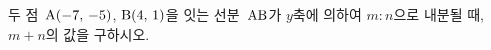 두 점~$\mathrm{A}(-7,\mkern3mu -5)$, $\mathrm{B}(4,\mkern3mu 1)$을 잇는 선분~$\mathrm{AB}$가 $y$축에 의하여 $m:n$으로 내분될 때, $m+n$의 값을 구하시오. 
